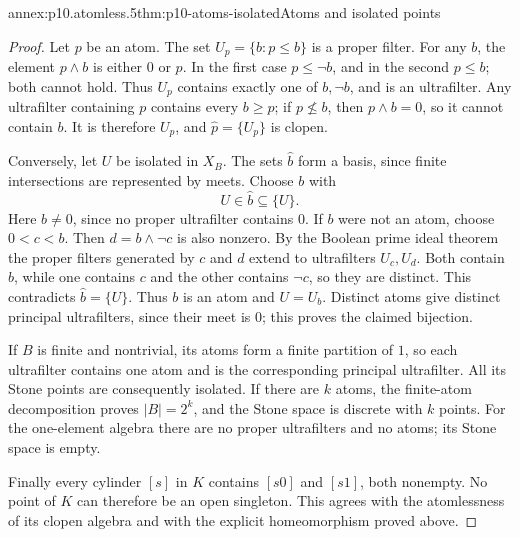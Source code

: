 \begin{annexitem}{annex:p10.atomless.5}{thm:p10-atoms-isolated}{Atoms and isolated points}
\begin{proof}
Let \(p\) be an atom.
The set \(U_p=\{b:p\leq b\}\) is a proper filter.
For any \(b\), the element \(p\wedge b\) is either \(0\)
or \(p\).
In the first case \(p\leq\neg b\), and in the second
\(p\leq b\); both cannot hold.
Thus \(U_p\) contains exactly one of \(b,\neg b\), and is
an ultrafilter.
Any ultrafilter containing \(p\) contains every \(b\geq p\);
if \(p\not\leq b\), then \(p\wedge b=0\), so it cannot
contain \(b\).
It is therefore \(U_p\), and
\(\widehat p=\{U_p\}\) is clopen.

Conversely, let \(U\) be isolated in \(X_B\).
The sets \(\widehat b\) form a basis, since finite intersections
are represented by meets.
Choose \(b\) with
\[
 U\in\widehat b\subseteq\{U\}.
\]
Here \(b\ne0\), since no proper ultrafilter contains \(0\).
If \(b\) were not an atom, choose \(0<c<b\).
Then \(d=b\wedge\neg c\) is also nonzero.
By the Boolean prime ideal theorem the proper filters generated
by \(c\) and \(d\) extend to ultrafilters \(U_c,U_d\).
Both contain \(b\), while one contains \(c\) and the other
contains \(\neg c\), so they are distinct.
This contradicts \(\widehat b=\{U\}\).
Thus \(b\) is an atom and \(U=U_b\).
Distinct atoms give distinct principal ultrafilters, since their
meet is \(0\); this proves the claimed bijection.

If \(B\) is finite and nontrivial, its atoms form a finite partition
of \(1\), so each ultrafilter contains one atom and is the
corresponding principal ultrafilter.
All its Stone points are consequently isolated.
If there are \(k\) atoms, the finite-atom decomposition proves
\(|B|=2^k\), and the Stone space is discrete with \(k\) points.
For the one-element algebra there are no proper ultrafilters and
no atoms; its Stone space is empty.

Finally every cylinder \([s]\) in \(K\) contains \([s0]\)
and \([s1]\), both nonempty.
No point of \(K\) can therefore be an open singleton.
This agrees with the atomlessness of its clopen algebra and with
the explicit homeomorphism proved above.
\end{proof}
\end{annexitem}
